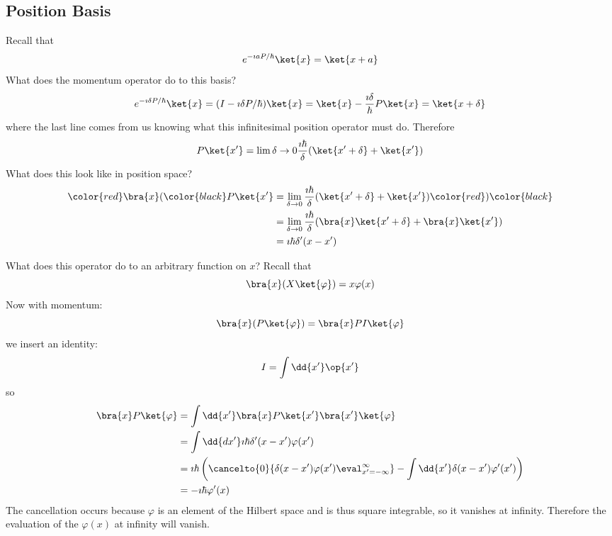 \documentclass[a4paper,twoside,master.tex]{subfiles}
\begin{document}
\subsection{Position Basis}
\label{sub:position_basis}
Recall that
\begin{equation}
    e^{-\imath a P / \hbar} \ket{x} = \ket{x + a}
\end{equation}
What does the momentum operator do to this basis?
\begin{equation}
    e^{-\imath \delta P / \hbar} \ket{x} = (I - \imath \delta P / \hbar) \ket{x} = \ket{x} - \frac{\imath \delta}{\hbar} P \ket{x} = \ket{x + \delta} 
\end{equation}
where the last line comes from us knowing what this infinitesimal position operator must do. Therefore
\begin{equation}
    P \ket{x'} = \lim{\delta \to 0} \frac{\imath\hbar}{\delta} (\ket{x'+ \delta} + \ket{x'})
\end{equation}
What does this look like in position space?
\begin{align}
    \color{red} \bra{x} (\color{black}P \ket{x'} &= \lim_{\delta \to 0} \frac{\imath\hbar}{\delta} (\ket{x'+ \delta} + \ket{x'}) \color{red})\color{black}\\
    &= \lim_{\delta \to 0} \frac{\imath\hbar}{\delta} ( \bra{x} \ket{x' + \delta} + \bra{x} \ket{x'})\\
    &= \imath\hbar \delta'(x-x')
\end{align}

What does this operator do to an arbitrary function on $ x $? Recall that
\begin{equation}
    \bra{x} (X \ket{\varphi} ) = x \varphi (x)
\end{equation}
Now with momentum:
\begin{equation}
    \bra{x} (P \ket{\varphi}) = \bra{x} P I \ket{\varphi}
\end{equation}
we insert an identity:
\begin{equation}
    I = \int \dd{x'} \op{x'}
\end{equation}
so
\begin{align}
    \bra{x} P \ket{\varphi} &= \int \dd{x'} \bra{x} P \ket{x'} \bra{x'} \ket{\varphi} \\
    &= \int \dd{dx'} \imath\hbar \delta'(x-x') \varphi (x')\\
    &= \imath\hbar \left( \cancelto{0}{\delta(x-x') \varphi(x')\eval_{x'=-\infty}^{\infty}} - \int \dd{x'} \delta(x-x') \varphi'(x') \right)\\
    &= -\imath\hbar \varphi'(x)
\end{align}
The cancellation occurs because $ \varphi $ is an element of the Hilbert space and is thus square integrable, so it vanishes at infinity. Therefore the evaluation of the $ \varphi (x) $ at infinity will vanish.
\end{document}
